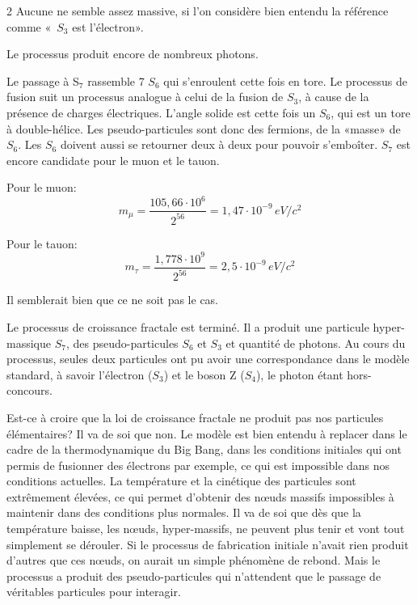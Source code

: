 \begin{multicols}{2}
Aucune ne semble assez massive, si l'on considère bien entendu la
référence comme « $S_3$ est l'électron».

Le processus produit encore de nombreux photons.

Le passage à S$_7$ rassemble 7 $S_6$ qui s'enroulent cette fois en tore. Le
processus de fusion suit un processus analogue à celui de la fusion de
$S_3$, à cause de la présence de charges électriques. L'angle solide est
cette fois un $S_6$, qui est un tore à double-hélice. Les
pseudo-particules sont donc des fermions, de la «masse» de $S_6$. Les
$S_6$ doivent aussi se retourner deux à deux pour pouvoir s'emboîter.
$S_7$ est encore candidate pour le muon et le tauon.

Pour le muon:
\begin{equation*}
m_{\mu} = \frac{105,66 \cdot 10^6} {2^{56}} = 1,47 \cdot 10^{-9}\,eV/c^2
\end{equation*}

Pour le tauon:
\begin{equation*}
m_{\tau} = \frac{1,778 \cdot 10^9}{2^{56}} = 2,5 \cdot 10^{-9}\,eV/c^2
\end{equation*}

Il semblerait bien que ce ne soit pas le cas.
\medskip

Le processus de croissance fractale est terminé. Il a produit une
particule hyper-massique $S_7$, des pseudo-particules $S_6$ et $S_3$ et
quantité de photons. Au cours du processus, seules deux particules ont
pu avoir une correspondance dans le modèle standard, à savoir
l'électron ($S_3$) et le boson Z ($S_4$), le photon étant hors-concours.

Est-ce à croire que la loi de croissance fractale ne produit pas nos
particules élémentaires? Il va de soi que non. Le modèle est bien
entendu à replacer dans le cadre de la thermodynamique du Big Bang,
dans les conditions initiales qui ont permis de fusionner des
électrons par exemple, ce qui est impossible dans nos conditions
actuelles. La température et la cinétique des particules sont
extrêmement élevées, ce qui permet d'obtenir des nœuds massifs
impossibles à maintenir dans des conditions plus normales. Il va de soi
que dès que la température baisse, les nœuds, hyper-massifs, ne
peuvent plus tenir et vont tout simplement se dérouler. Si le
processus de fabrication initiale n'avait rien produit d'autres que
ces nœuds, on aurait un simple phénomène de rebond. Mais le processus a
produit des pseudo-particules qui n'attendent que le passage de
véritables particules pour interagir.
\medskip


\end{multicols}
